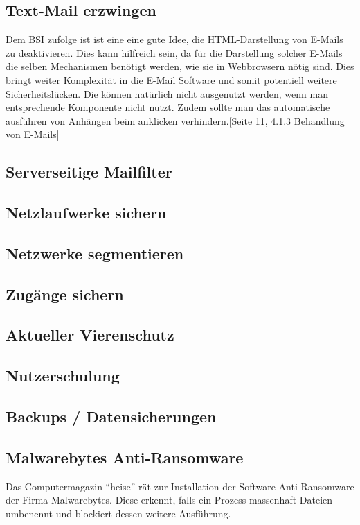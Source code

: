\subsection{Text-Mail erzwingen}
	Dem BSI zufolge ist ist eine eine gute Idee, die HTML-Darstellung von E-Mails zu deaktivieren. Dies kann hilfreich sein, da für die Darstellung solcher E-Mails die selben Mechanismen benötigt werden, wie sie in Webbrowsern nötig sind. Dies bringt weiter Komplexität in die E-Mail Software und somit potentiell weitere Sicherheitslücken. Die können natürlich nicht ausgenutzt werden, wenn man entsprechende Komponente nicht nutzt. Zudem sollte man das automatische ausführen von Anhängen beim anklicken verhindern.\cite{bsi:ransome}[Seite 11, 4.1.3 Behandlung von E-Mails]
\subsection{Serverseitige Mailfilter}
	
\subsection{Netzlaufwerke sichern}
\subsection{Netzwerke segmentieren}
\subsection{Zugänge sichern}
\subsection{Aktueller Vierenschutz}
\subsection{Nutzerschulung}
\subsection{Backups / Datensicherungen}
\subsection{Malwarebytes Anti-Ransomware}
Das Computermagazin ``heise'' rät zur Installation der Software Anti-Ransomware der Firma Malwarebytes. Diese erkennt, falls ein Prozess massenhaft Dateien umbenennt und blockiert dessen weitere Ausführung\cite{malwarebytes}.

